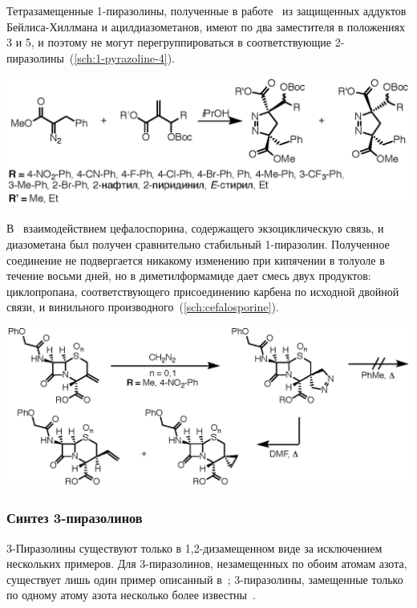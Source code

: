 Тетразамещенные 1-пиразолины, полученные в работе~\cite{Sun2013} из защищенных аддуктов Бейлиса-Хиллмана и ацилдиазометанов, имеют по два заместителя в положениях 3 и 5, и поэтому не могут перегруппироваться в соответствующие 2-пиразолины~(\ref{sch:1-pyrazoline-4}).

\begin{scheme}[h!]
    \centering
    \includegraphics{sections/literature/img/1-pyrazoline-4.eps}
    \caption{}
    \label{sch:1-pyrazoline-4}
\end{scheme}

В~\cite{Baldwin1990} взаимодействием цефалоспорина, содержащего экзоциклическую связь, и диазометана был получен сравнительно стабильный 1-пиразолин.
Полученное соединение не подвергается никакому изменению при кипячении в толуоле в течение восьми дней, но в диметилформамиде дает смесь двух продуктов: циклопропана, соответствующего присоединению карбена по исходной двойной связи, и винильного производного~(\ref{sch:cefalosporine}).

\begin{scheme}[h!]
    \centering
    \includegraphics{sections/literature/img/cefalosporine.eps}
    \caption{}
    \label{sch:cefalosporine}
\end{scheme}
\FloatBarrier{}


\subsubsection{Синтез 3-пиразолинов}
3-Пиразолины существуют только в 1,2-дизамещенном виде за исключением нескольких примеров.
Для 3-пиразолинов, незамещенных по обоим атомам азота, существует лишь один пример описанный в~\cite{Misani1956}; 3-пиразолины, замещенные только по одному атому азота несколько более известны~\cite{Takamizawa1963, Takamizawa1965, Armstrong1973, Burger1979}.

